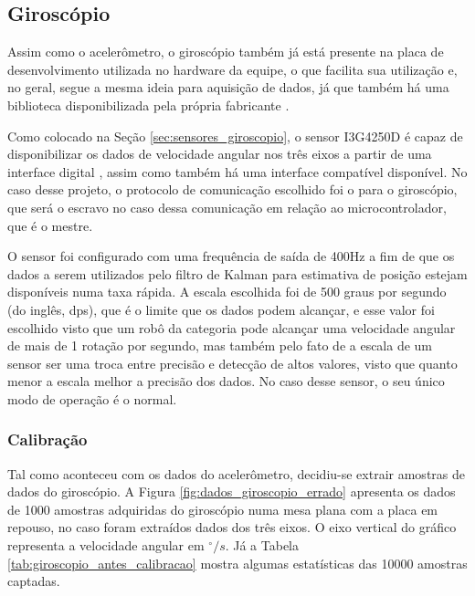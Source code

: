 \documentclass[acronym, symbols, table, deposito]{fei}
\begin{document}
	\subsection{Giroscópio}
	
	Assim como o acelerômetro, o giroscópio também já está presente na placa de desenvolvimento utilizada no hardware da equipe, o que facilita sua utilização e, no geral, segue a mesma ideia para aquisição de dados, já que também há uma biblioteca disponibilizada pela própria fabricante \cite{gyro_repository}.
	
	Como colocado na Seção \ref{sec:sensores_giroscopio}, o sensor I3G4250D é capaz de disponibilizar os dados de velocidade angular nos três eixos a partir de uma interface digital , assim como também há uma interface  compatível disponível. No caso desse projeto, o protocolo de comunicação escolhido foi o  para o giroscópio, que será o escravo no caso dessa comunicação em relação ao microcontrolador, que é o mestre.
	
	O sensor foi configurado com uma frequência de saída de 400Hz a fim de que os dados a serem utilizados pelo filtro de Kalman para estimativa de posição estejam disponíveis numa taxa rápida. A escala escolhida foi de 500 graus por segundo (do inglês, dps), que é o limite que os dados podem alcançar, e esse valor foi escolhido visto que um robô da categoria  pode alcançar uma velocidade angular de mais de 1 rotação por segundo, mas também pelo fato de a escala de um sensor ser uma troca entre precisão e detecção de altos valores, visto que quanto menor a escala melhor a precisão dos dados. No caso desse sensor, o seu único modo de operação é o normal.
	
	\subsubsection{Calibração}
	
	Tal como aconteceu com os dados do acelerômetro, decidiu-se extrair amostras de dados do giroscópio. A Figura \ref{fig:dados_giroscopio_errado} apresenta os dados de 1000 amostras adquiridas do giroscópio numa mesa plana com a placa em repouso, no caso foram extraídos dados dos três eixos. O eixo vertical do gráfico representa a velocidade angular em $^\circ/s$. Já a Tabela \ref{tab:giroscopio_antes_calibracao} mostra algumas estatísticas das 10000 amostras captadas.
	
\end{document}
